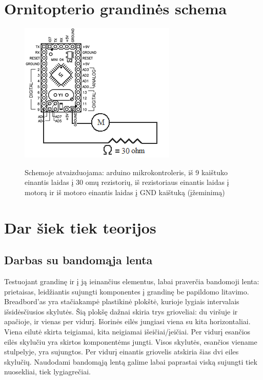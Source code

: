 \documentclass{VUMIFPSkursinis}
\begin{document}
\section{Ornitopterio grandinės schema} 
\begin{figure}[h]
	\caption{Schemoje atvaizduojama: arduino mikrokontroleris, iš 9 kaištuko einantis laidas į  30 omų rezistorių, iš rezistoriaus einantis laidas į motorą ir iš motoro einantis laidas į GND kaištuką (įžeminimą)}
	\centering
	\includegraphics{img/scheme}\\
\end{figure}

\section{Dar šiek tiek teorijos}
\subsection{Darbas su bandomąja lenta}
Testuojant grandinę ir į ją ieinančius elementus, labai praverčia bandomoji lenta: prietaisas, leidžiantis sujungti komponentes į grandinę be papildomo litavimo. Breadbord'as yra stačiakampė plastikinė plokštė, kurioje lygiais intervalais išsidėsčiusios skylutės. Šią plokšę dažnai skiria trys grioveliai: du viršuje ir apačioje, ir vienas per vidurį. Išorinės eilės jungiasi viena su kita horizontaliai. Viena eilutė skirta teigiamai, kita neigiamai išeičiai/įeičiai. Per vidurį esančios eilės skylučiu yra skirtos komponentėms jungti. Visos skylutės, esančios viename stulpelyje, yra sujungtos. Per vidurį einantis griovelis atskiria šias dvi eiles skylučių. Naudodami bandomąją lentą galime labai paprastai viską sujungti tiek nuosekliai, tiek lygiagrečiai.\\
\end{document}
